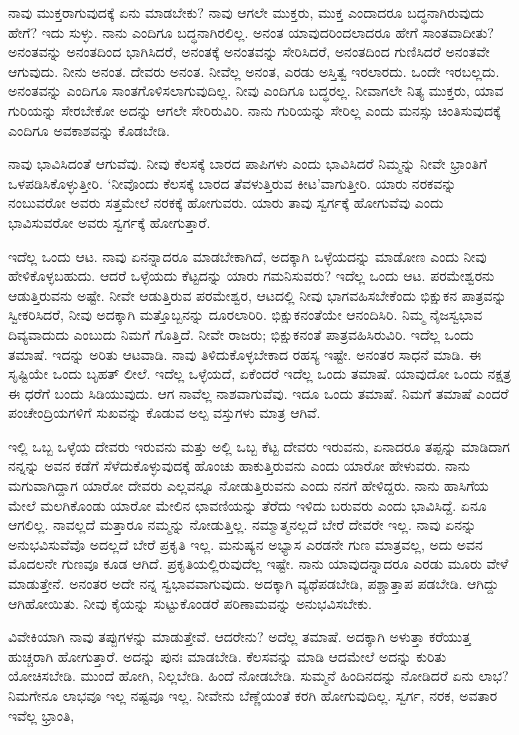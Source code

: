 ನಾವು ಮುಕ್ತರಾಗುವುದಕ್ಕೆ ಏನು ಮಾಡಬೇಕು? ನಾವು ಆಗಲೇ ಮುಕ್ತರು, ಮುಕ್ತ ಎಂದಾದರೂ ಬದ್ಧನಾಗಿರುವುದು ಹೇಗೆ? ಇದು ಸುಳ್ಳು. ನಾನು ಎಂದಿಗೂ ಬದ್ಧನಾಗಿರಲಿಲ್ಲ. ಅನಂತ ಯಾವುದರಿಂದಲಾದರೂ ಹೇಗೆ ಸಾಂತವಾದೀತು? ಅನಂತವನ್ನು ಅನಂತದಿಂದ ಭಾಗಿಸಿದರೆ, ಅನಂತಕ್ಕೆ ಅನಂತವನ್ನು ಸೇರಿಸಿದರೆ, ಅನಂತದಿಂದ ಗುಣಿಸಿದರೆ ಅನಂತವೇ ಆಗುವುದು. ನೀನು ಅನಂತ. ದೇವರು ಅನಂತ. ನೀವೆಲ್ಲ ಅನಂತ, ಎರಡು ಅಸ್ತಿತ್ವ ಇರಲಾರದು. ಒಂದೇ ಇರಬಲ್ಲದು. ಅನಂತವನ್ನು ಎಂದಿಗೂ ಸಾಂತಗೊಳಿಸಲಾಗುವುದಿಲ್ಲ. ನೀವು ಎಂದಿಗೂ ಬದ್ಧರಲ್ಲ. ನೀವಾಗಲೇ ನಿತ್ಯ ಮುಕ್ತರು, ಯಾವ ಗುರಿಯನ್ನು ಸೇರಬೇಕೋ ಅದನ್ನು ಆಗಲೇ ಸೇರಿರುವಿರಿ. ನಾನು ಗುರಿಯನ್ನು ಸೇರಿಲ್ಲ ಎಂದು ಮನಸ್ಸು ಚಿಂತಿಸುವುದಕ್ಕೆ ಎಂದಿಗೂ ಅವಕಾಶವನ್ನು ಕೊಡಬೇಡಿ.

ನಾವು ಭಾವಿಸಿದಂತೆ ಆಗುವೆವು. ನೀವು ಕೆಲಸಕ್ಕೆ ಬಾರದ ಪಾಪಿಗಳು ಎಂದು ಭಾವಿಸಿದರೆ ನಿಮ್ಮನ್ನು ನೀವೇ ಭ್ರಾಂತಿಗೆ ಒಳಪಡಿಸಿಕೊಳ್ಳುತ್ತೀರಿ. `ನೀವೊಂದು ಕೆಲಸಕ್ಕೆ ಬಾರದ ತೆವಳುತ್ತಿರುವ ಕೀಟ'ವಾಗುತ್ತೀರಿ. ಯಾರು ನರಕವನ್ನು ನಂಬುವರೋ ಅವರು ಸತ್ತಮೇಲೆ ನರಕಕ್ಕೆ ಹೋಗುವರು. ಯಾರು ತಾವು ಸ್ವರ್ಗಕ್ಕೆ ಹೋಗುವೆವು ಎಂದು ಭಾವಿಸುವರೋ ಅವರು ಸ್ವರ್ಗಕ್ಕೆ ಹೋಗುತ್ತಾರೆ.

ಇದೆಲ್ಲ ಒಂದು ಆಟ. ನಾವು ಏನನ್ನಾದರೂ ಮಾಡಬೇಕಾಗಿದೆ, ಅದಕ್ಕಾಗಿ ಒಳ್ಳೆಯದನ್ನು ಮಾಡೋಣ ಎಂದು ನೀವು ಹೇಳಿಕೊಳ್ಳಬಹುದು. ಆದರೆ ಒಳ್ಳೆಯದು ಕೆಟ್ಟದನ್ನು ಯಾರು ಗಮನಿಸುವರು? ಇದೆಲ್ಲ ಒಂದು ಆಟ. ಪರಮೇಶ್ವರನು ಆಡುತ್ತಿರುವನು ಅಷ್ಟೇ. ನೀವೇ ಆಡುತ್ತಿರುವ ಪರಮೇಶ್ವರ, ಆಟದಲ್ಲಿ ನೀವು ಭಾಗವಹಿಸಬೇಕೆಂದು ಭಿಕ್ಷುಕನ ಪಾತ್ರವನ್ನು ಸ್ವೀಕರಿಸಿದರೆ, ನೀವು ಅದಕ್ಕಾಗಿ ಮತ್ತೊಬ್ಬನನ್ನು ದೂರಲಾರಿರಿ. ಭಿಕ್ಷುಕನಂತೆಯೇ ಆನಂದಿಸಿರಿ. ನಿಮ್ಮ ನೈಜಸ್ವಭಾವ ದಿವ್ಯವಾದುದು ಎಂಬುದು ನಿಮಗೆ ಗೊತ್ತಿದೆ. ನೀವೇ ರಾಜರು; ಭಿಕ್ಷುಕನಂತೆ ಪಾತ್ರವಹಿಸಿರುವಿರಿ. ಇದೆಲ್ಲ ಒಂದು ತಮಾಷೆ. ಇದನ್ನು ಅರಿತು ಆಟವಾಡಿ. ನಾವು ತಿಳಿದುಕೊಳ್ಳಬೇಕಾದ ರಹಸ್ಯ ಇಷ್ಟೇ. ಅನಂತರ ಸಾಧನೆ ಮಾಡಿ. ಈ ಸೃಷ್ಟಿಯೇ ಒಂದು ಬೃಹತ್ ಲೀಲೆ. ಇದೆಲ್ಲ ಒಳ್ಳೆಯದೆ, ಏಕೆಂದರೆ ಇದೆಲ್ಲ ಒಂದು ತಮಾಷೆ. ಯಾವುದೋ ಒಂದು ನಕ್ಷತ್ರ ಈ ಧರೆಗೆ ಬಂದು ಸಿಡಿಯುವುದು. ಆಗ ನಾವೆಲ್ಲ ನಾಶವಾಗುವೆವು. ಇದೂ ಒಂದು ತಮಾಷೆ. ನಿಮಗೆ ತಮಾಷೆ ಎಂದರೆ ಪಂಚೇಂದ್ರಿಯಗಳಿಗೆ ಸುಖವನ್ನು ಕೊಡುವ ಅಲ್ಪ ವಸ್ತುಗಳು ಮಾತ್ರ ಆಗಿವೆ.

ಇಲ್ಲಿ ಒಬ್ಬ ಒಳ್ಳೆಯ ದೇವರು ಇರುವನು ಮತ್ತು ಅಲ್ಲಿ ಒಬ್ಬ ಕೆಟ್ಟ ದೇವರು ಇರುವನು, ಏನಾದರೂ ತಪ್ಪನ್ನು ಮಾಡಿದಾಗ ನನ್ನನ್ನು ಅವನ ಕಡೆಗೆ ಸೆಳೆದುಕೊಳ್ಳುವುದಕ್ಕೆ ಹೊಂಚು ಹಾಕುತ್ತಿರುವನು ಎಂದು ಯಾರೋ ಹೇಳುವರು. ನಾನು ಮಗುವಾಗಿದ್ದಾಗ ಯಾರೋ ದೇವರು ಎಲ್ಲವನ್ನೂ ನೋಡುತ್ತಿರುವನು ಎಂದು ನನಗೆ ಹೇಳಿದ್ದರು. ನಾನು ಹಾಸಿಗೆಯ ಮೇಲೆ ಮಲಗಿಕೊಂಡು ಯಾರೋ ಮೇಲಿನ ಛಾವಣಿಯನ್ನು ತೆರೆದು ಇಳಿದು ಬರುವರು ಎಂದು ಭಾವಿಸಿದ್ದೆ. ಏನೂ ಆಗಲಿಲ್ಲ. ನಾವಲ್ಲದೆ ಮತ್ತಾರೂ ನಮ್ಮನ್ನು ನೋಡುತ್ತಿಲ್ಲ. ನಮ್ಮಾತ್ಮನಲ್ಲದೆ ಬೇರೆ ದೇವರೇ ಇಲ್ಲ. ನಾವು ಏನನ್ನು ಅನುಭವಿಸುವೆವೊ ಅದಲ್ಲದೆ ಬೇರೆ ಪ್ರಕೃತಿ ಇಲ್ಲ. ಮನುಷ್ಯನ ಅಭ್ಯಾಸ ಎರಡನೇ ಗುಣ ಮಾತ್ರವಲ್ಲ, ಅದು ಅವನ ಮೊದಲನೇ ಗುಣವೂ ಕೂಡ ಆಗಿದೆ. ಪ್ರಕೃತಿಯಲ್ಲಿರುವುದೆಲ್ಲ ಇಷ್ಟೇ. ನಾನು ಯಾವುದನ್ನಾದರೂ ಎರಡು ಮೂರು ವೇಳೆ ಮಾಡುತ್ತೇನೆ. ಅನಂತರ ಅದೇ ನನ್ನ ಸ್ವಭಾವವಾಗುವುದು. ಅದಕ್ಕಾಗಿ ವ್ಯಥೆಪಡಬೇಡಿ, ಪಶ್ಚಾತ್ತಾಪ ಪಡಬೇಡಿ. ಆಗಿದ್ದು ಆಗಿಹೋಯಿತು. ನೀವು ಕೈಯನ್ನು ಸುಟ್ಟುಕೊಂಡರೆ ಪರಿಣಾಮವನ್ನು ಅನುಭವಿಸಬೇಕು.

ವಿವೇಕಿಯಾಗಿ ನಾವು ತಪ್ಪುಗಳನ್ನು ಮಾಡುತ್ತೇವೆ. ಆದರೇನು? ಅದೆಲ್ಲ ತಮಾಷೆ. ಅದಕ್ಕಾಗಿ ಅಳುತ್ತಾ ಕರೆಯುತ್ತ ಹುಚ್ಚರಾಗಿ ಹೋಗುತ್ತಾರೆ. ಅದನ್ನು ಪುನಃ ಮಾಡಬೇಡಿ. ಕೆಲಸವನ್ನು ಮಾಡಿ ಆದಮೇಲೆ ಅದನ್ನು ಕುರಿತು ಯೋಚಿಸಬೇಡಿ. ಮುಂದೆ ಹೋಗಿ, ನಿಲ್ಲಬೇಡಿ. ಹಿಂದೆ ನೋಡಬೇಡಿ. ಸುಮ್ಮನೆ ಹಿಂದಿನದನ್ನು ನೋಡಿದರೆ ಏನು ಲಾಭ? ನಿಮಗೇನೂ ಲಾಭವೂ ಇಲ್ಲ ನಷ್ಟವೂ ಇಲ್ಲ. ನೀವೇನು ಬೆಣ್ಣೆಯಂತೆ ಕರಗಿ ಹೋಗುವುದಿಲ್ಲ. ಸ್ವರ್ಗ, ನರಕ, ಅವತಾರ ಇವೆಲ್ಲ ಭ್ರಾಂತಿ,


